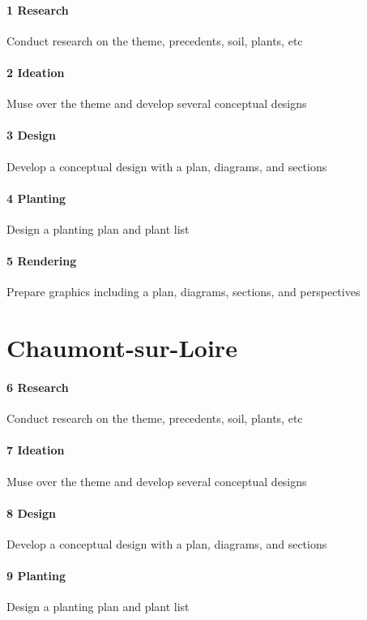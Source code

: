 \documentclass[11pt,article,oneside]{memoir}
\begin{document}
\paragraph{1 Research} Conduct research on the theme, precedents, soil, plants, etc\dotfill

\paragraph{2 Ideation} Muse over the theme and develop several conceptual designs\dotfill

\paragraph{3 Design} Develop a conceptual design with a plan, diagrams, and sections\dotfill

\paragraph{4 Planting} Design a planting plan and plant list\dotfill

\paragraph{5 Rendering} Prepare graphics including a plan, diagrams, sections, and perspectives\dotfill

\section{Chaumont-sur-Loire}

\paragraph{6 Research} Conduct research on the theme, precedents, soil, plants, etc\dotfill

\paragraph{7 Ideation} Muse over the theme and develop several conceptual designs\dotfill

\paragraph{8 Design} Develop a conceptual design with a plan, diagrams, and sections\dotfill

\paragraph{9 Planting} Design a planting plan and plant list\dotfill
\end{document}
